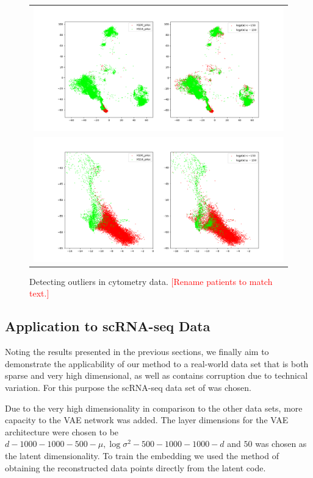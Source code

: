 \begin{figure}[!htb]
  \centering
  \begin{tabular}{c}
    \includegraphics[width=\textwidth]{images/scored.png} \\
    \includegraphics[width=\textwidth]{images/scored_zoomed.png}
  \end{tabular}
  \caption{Detecting outliers in cytometry data. \textcolor{red}{[Rename patients to match text.]}}
  \label{fig:cytometry_outliers}
\end{figure}

\subsection{Application to scRNA-seq Data}
\label{section:application_to_scrna}

Noting the results presented in the previous sections, we finally aim to demonstrate the applicability of our method to a real-world data set that is both sparse and very high dimensional, as well as contains corruption due to technical variation. For this purpose the scRNA-seq data set of \cite{tirosh} was chosen.

Due to the very high dimensionality in comparison to the other data sets, more capacity to the VAE network was added. The layer dimensions for the VAE architecture were chosen to be $d - 1000 - 1000 - 500 - \mu, \log \sigma^2 - 500 - 1000 - 1000 - d$ and $50$ was chosen as the latent dimensionality. To train the embedding we used the method of obtaining the reconstructed data points directly from the latent code.

